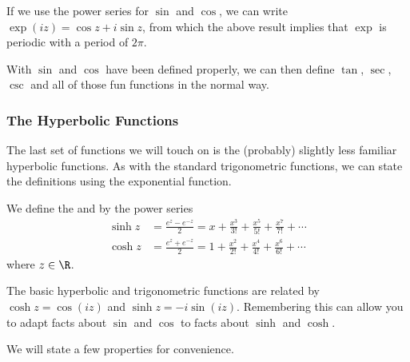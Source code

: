 \documentclass[a4paper]{scrartcl}
\begin{document}
\begin{remark}
	If we use the power series for $\sin$ and $\cos$, we can write $\exp(iz) = \cos z + i \sin z$, from which the above result implies that $\exp$ is periodic with a period of $2\pi$.
\end{remark}

With $\sin$ and $\cos$ have been defined properly, we can then define $\tan$, $\sec$, $\csc$ and all of those fun functions in the normal way.

\subsubsection{The Hyperbolic Functions}

The last set of functions we will touch on is the (probably) slightly less familiar hyperbolic functions. As with the standard trigonometric functions, we can state the definitions using the exponential function.

\begin{definition}
	We define the  and  by the power series
	\begin{align*}
		\sinh z &= \frac{e^z - e^{-z}}{2} = x+\frac{x^{3}}{3 !}+\frac{x^{5}}{5 !}+\frac{x^{7}}{7 !}+\cdots \\
		\cosh z &= \frac{e^z + e^{-z}}{2} = 1+\frac{x^{2}}{2 !}+\frac{x^{4}}{4 !}+\frac{x^{6}}{6 !}+\cdots
	\end{align*}
	where $z \in \R$.
\end{definition}

\begin{remark}
	The basic hyperbolic and trigonometric functions are related by $\cosh z = \cos(iz)$ and $\sinh z = -i \sin (iz)$. Remembering this can allow you to adapt facts about $\sin$ and $\cos$ to facts about $\sinh$ and $\cosh$.
\end{remark}

We will state a few properties for convenience.
\end{document}
